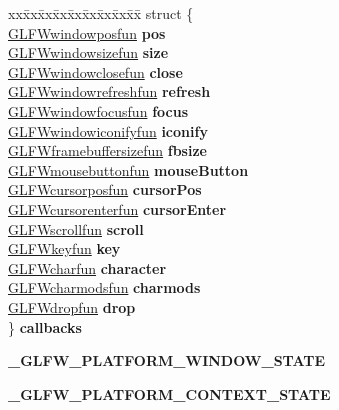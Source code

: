 \begin{DoxyCompactItemize}
\item 
\hypertarget{struct__GLFWwindow_aeedfd79e9879dd3de6576c4ecb86727e}{}\begin{tabbing}
xx\=xx\=xx\=xx\=xx\=xx\=xx\=xx\=xx\=\kill
struct \{\\
\>\hyperlink{group__window_gafd8db81fdb0e850549dc6bace5ed697a}{GLFWwindowposfun} {\bfseries pos}\\
\>\hyperlink{group__window_gae49ee6ebc03fa2da024b89943a331355}{GLFWwindowsizefun} {\bfseries size}\\
\>\hyperlink{group__window_ga93e7c2555bd837f4ed8b20f76cada72e}{GLFWwindowclosefun} {\bfseries close}\\
\>\hyperlink{group__window_ga7a56f9e0227e2cd9470d80d919032e08}{GLFWwindowrefreshfun} {\bfseries refresh}\\
\>\hyperlink{group__window_ga58be2061828dd35080bb438405d3a7e2}{GLFWwindowfocusfun} {\bfseries focus}\\
\>\hyperlink{group__window_gad2d4e4c3d28b1242e742e8268b9528af}{GLFWwindowiconifyfun} {\bfseries iconify}\\
\>\hyperlink{group__window_ga3e218ef9ff826129c55a7d5f6971a285}{GLFWframebuffersizefun} {\bfseries fbsize}\\
\>\hyperlink{group__input_ga39893a4a7e7c3239c98d29c9e084350c}{GLFWmousebuttonfun} {\bfseries mouseButton}\\
\>\hyperlink{group__input_ga4cfad918fa836f09541e7b9acd36686c}{GLFWcursorposfun} {\bfseries cursorPos}\\
\>\hyperlink{group__input_ga51ab436c41eeaed6db5a0c9403b1c840}{GLFWcursorenterfun} {\bfseries cursorEnter}\\
\>\hyperlink{group__input_ga4687e2199c60a18a8dd1da532e6d75c9}{GLFWscrollfun} {\bfseries scroll}\\
\>\hyperlink{group__input_ga0192a232a41e4e82948217c8ba94fdfd}{GLFWkeyfun} {\bfseries key}\\
\>\hyperlink{group__input_gabf24451c7ceb1952bc02b17a0d5c3e5f}{GLFWcharfun} {\bfseries character}\\
\>\hyperlink{group__input_gae36fb6897d2b7df9b128900c8ce9c507}{GLFWcharmodsfun} {\bfseries charmods}\\
\>\hyperlink{group__input_gab71f4ca80b651462852e601caf308c4a}{GLFWdropfun} {\bfseries drop}\\
\} {\bfseries callbacks}\label{struct__GLFWwindow_aeedfd79e9879dd3de6576c4ecb86727e}
\\

\end{tabbing}\item 
\hypertarget{struct__GLFWwindow_a111e66654cecdfc6395ec2458bdb4387}{}{\bfseries \+\_\+\+G\+L\+F\+W\+\_\+\+P\+L\+A\+T\+F\+O\+R\+M\+\_\+\+W\+I\+N\+D\+O\+W\+\_\+\+S\+T\+A\+T\+E}\label{struct__GLFWwindow_a111e66654cecdfc6395ec2458bdb4387}

\item 
\hypertarget{struct__GLFWwindow_aace6fa43962d3cf0d435e742a7b3ff7d}{}{\bfseries \+\_\+\+G\+L\+F\+W\+\_\+\+P\+L\+A\+T\+F\+O\+R\+M\+\_\+\+C\+O\+N\+T\+E\+X\+T\+\_\+\+S\+T\+A\+T\+E}\label{struct__GLFWwindow_aace6fa43962d3cf0d435e742a7b3ff7d}

\end{DoxyCompactItemize}
